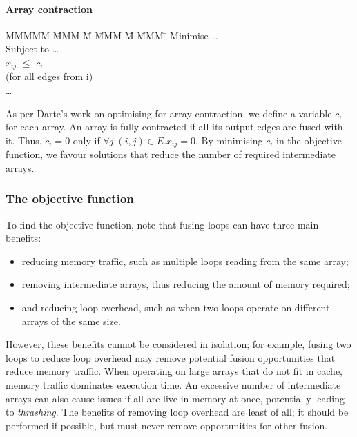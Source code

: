 \paragraph{Array contraction}
\begin{tabbing}
MMMMM   \= MMM \= M \= MMM \= M \= MMM \= \kill
Minimise   \> \ldots \\
Subject to \> \ldots \\
           \> $x_{ij}$    \> $\le$ \> $c_i$           \>       \>            \\
           \> (for all edges from i)            \\
           \> \ldots \\
\end{tabbing}
As per Darte's work on optimising for array contraction\cite{darte2002contraction}, we define a variable $c_i$ for each array.
An array is fully contracted if all its output edges are fused with it.
Thus, $c_i=0$ only if $\forall j | (i,j) \in E. x_{ij} = 0$.
By minimising $c_i$ in the objective function, we favour solutions that reduce the number of required intermediate arrays.


\subsubsection{The objective function}

To find the objective function, note that fusing loops can have three main benefits:
\begin{itemize}
\item
reducing memory traffic, such as multiple loops reading from the same array;
\item
removing intermediate arrays, thus reducing the amount of memory required;
\item
and reducing loop overhead, such as when two loops operate on different arrays of the same size.
\end{itemize}
However, these benefits cannot be considered in isolation; for example, fusing two loops to reduce loop overhead may remove potential fusion opportunities that reduce memory traffic.
When operating on large arrays that do not fit in cache, memory traffic dominates execution time.
An excessive number of intermediate arrays can also cause issues if all are live in memory at once, potentially leading to \emph{thrashing}.
The benefits of removing loop overhead are least of all; it should be performed if possible, but must never remove opportunities for other fusion.

